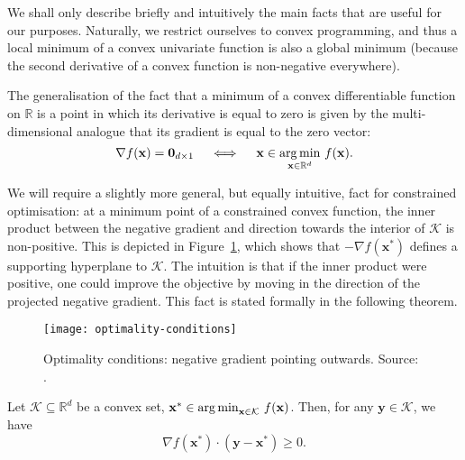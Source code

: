 We shall only describe briefly and intuitively the main facts that are useful for our purposes. Naturally, we restrict ourselves to convex programming, and thus a local minimum of a convex univariate function is also a global minimum (because the second derivative of a convex function is non-negative everywhere).

The generalisation of the fact that a minimum of a convex differentiable function on $\mathbb{R}$ is a point in which its derivative is equal to zero is given by the multi-dimensional analogue that its gradient is equal to the zero vector:
\begin{equation}
\nabla f(\mathbf{x}) = \mathbf{0}_{d\times 1} \quad \iff \quad \mathbf{x} \in \operatorname*{arg\,min}_{\mathbf{x} \in \mathbb{R}^d} \, f(\mathbf{x}). 
\end{equation}

We will require a slightly more general, but equally intuitive, fact for constrained optimisation: at a minimum point of a constrained convex function, the inner product between the negative gradient and direction towards the interior of $\mathcal{K}$ is non-positive. This is depicted in Figure~\ref{fig:optimality-conditions}, which shows that $-\nabla f(\mathbf{x}^*)$ defines a supporting hyperplane to $\mathcal{K}$. The intuition is that if the inner product were positive, one could improve the objective by moving in the direction of the projected negative gradient. This fact is stated formally in the following theorem.
\begin{figure}[t]
\centering
\texttt{[image: optimality-conditions]}
\caption{Optimality conditions: negative gradient pointing outwards. Source: \citep{oco}.}
\label{fig:optimality-conditions}
\end{figure}
\begin{theorem}
\label{thm:kkt}
Let $\mathcal{K} \subseteq \mathbb{R}^d$ be a convex set, $\mathbf{x}^* \in \operatorname*{arg\,min}_{\mathbf{x} \in \mathcal{K}} \, f(\mathbf{x})$. Then, for any $\mathbf{y} \in \mathcal{K}$, we have
\begin{equation}
\nabla f(\mathbf{x}^*) \cdot (\mathbf{y} - \mathbf{x}^*) \geq 0.
\end{equation}
\end{theorem}


